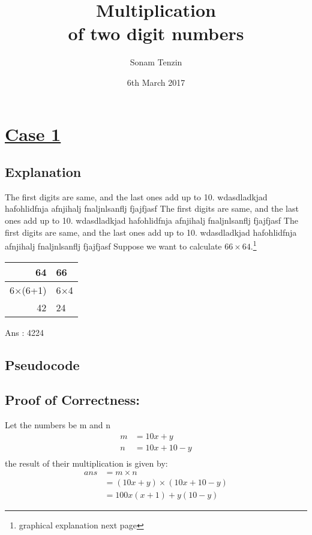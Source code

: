 \documentclass[11pt, a4paper]{article}
\title{Multiplication \\of two digit numbers}
\author{Sonam Tenzin}
\date{6th March 2017}
\begin{document}
	\maketitle
	\newpage
	\section{\underline{Case 1}}
	\subsection{Explanation}
	The first digits are same, and the last ones add up to 10. wdasdladkjad hafohlidfnja afnjihalj fnaljnlsanflj  fjajfjasf The first digits are same, and the last ones add up to 10. wdasdladkjad hafohlidfnja afnjihalj fnaljnlsanflj  fjajfjasf The first digits are same, and the last ones add up to 10. wdasdladkjad hafohlidfnja afnjihalj fnaljnlsanflj  fjajfjasf
	Suppose we want to calculate $66 \times 64$.\footnote{graphical explanation next page}\\
	

	{\begin{center}
	\begin{tabular}{rl}
		64 & 66\\
		\hline
		 6$\times$(6+1) & 6$\times$4\\
		 42 & 24\\
		 
	\end{tabular}
	\end{center}}
	Ans : 4224
		
	\subsection{Pseudocode}\label{B1}
	\begin{algorithm}
		{}
	\end{algorithm}
		
	\subsection{Proof of Correctness:\label{C1}\\}
	Let the numbers be m and n
	\begin{align*}
		m &= 10x+y\\%
		n &= 10x+10-y\\%
	\end{align*}
	the result of their multiplication is given by:\\
	\begin{align*}
		ans &= m \times n\\
				&= (10x+y) \times (10x +10-y)\\
				&= 100x(x+1) + y(10-y) 
	\end{align*}
	
	
\end{document}
